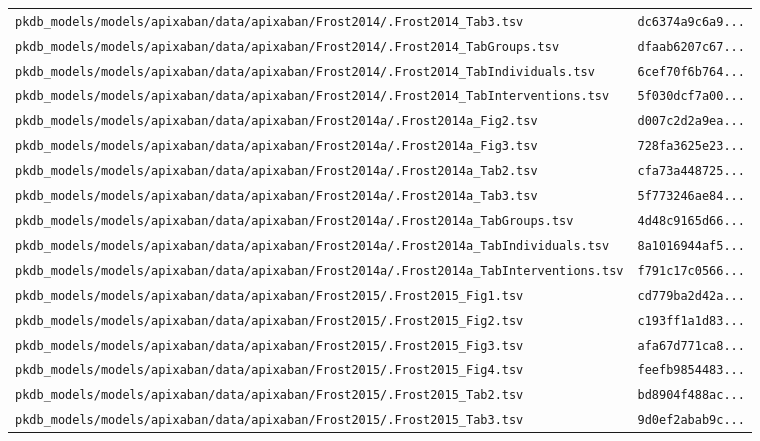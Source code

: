 \begin{longtable}{ll}
\texttt{pkdb\_models/models/apixaban/data/apixaban/Frost2014/.Frost2014\_Tab3.tsv} & \texttt{dc6374a9c6a9...} \\
\texttt{pkdb\_models/models/apixaban/data/apixaban/Frost2014/.Frost2014\_TabGroups.tsv} & \texttt{dfaab6207c67...} \\
\texttt{pkdb\_models/models/apixaban/data/apixaban/Frost2014/.Frost2014\_TabIndividuals.tsv} & \texttt{6cef70f6b764...} \\
\texttt{pkdb\_models/models/apixaban/data/apixaban/Frost2014/.Frost2014\_TabInterventions.tsv} & \texttt{5f030dcf7a00...} \\
\texttt{pkdb\_models/models/apixaban/data/apixaban/Frost2014a/.Frost2014a\_Fig2.tsv} & \texttt{d007c2d2a9ea...} \\
\texttt{pkdb\_models/models/apixaban/data/apixaban/Frost2014a/.Frost2014a\_Fig3.tsv} & \texttt{728fa3625e23...} \\
\texttt{pkdb\_models/models/apixaban/data/apixaban/Frost2014a/.Frost2014a\_Tab2.tsv} & \texttt{cfa73a448725...} \\
\texttt{pkdb\_models/models/apixaban/data/apixaban/Frost2014a/.Frost2014a\_Tab3.tsv} & \texttt{5f773246ae84...} \\
\texttt{pkdb\_models/models/apixaban/data/apixaban/Frost2014a/.Frost2014a\_TabGroups.tsv} & \texttt{4d48c9165d66...} \\
\texttt{pkdb\_models/models/apixaban/data/apixaban/Frost2014a/.Frost2014a\_TabIndividuals.tsv} & \texttt{8a1016944af5...} \\
\texttt{pkdb\_models/models/apixaban/data/apixaban/Frost2014a/.Frost2014a\_TabInterventions.tsv} & \texttt{f791c17c0566...} \\
\texttt{pkdb\_models/models/apixaban/data/apixaban/Frost2015/.Frost2015\_Fig1.tsv} & \texttt{cd779ba2d42a...} \\
\texttt{pkdb\_models/models/apixaban/data/apixaban/Frost2015/.Frost2015\_Fig2.tsv} & \texttt{c193ff1a1d83...} \\
\texttt{pkdb\_models/models/apixaban/data/apixaban/Frost2015/.Frost2015\_Fig3.tsv} & \texttt{afa67d771ca8...} \\
\texttt{pkdb\_models/models/apixaban/data/apixaban/Frost2015/.Frost2015\_Fig4.tsv} & \texttt{feefb9854483...} \\
\texttt{pkdb\_models/models/apixaban/data/apixaban/Frost2015/.Frost2015\_Tab2.tsv} & \texttt{bd8904f488ac...} \\
\texttt{pkdb\_models/models/apixaban/data/apixaban/Frost2015/.Frost2015\_Tab3.tsv} & \texttt{9d0ef2abab9c...} \\

\end{longtable}
